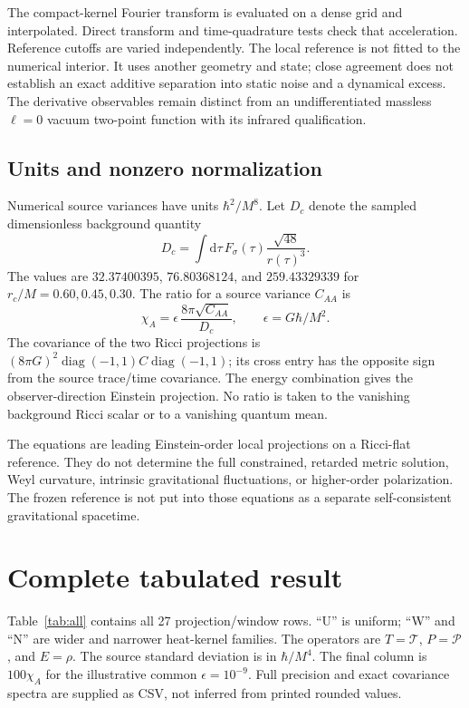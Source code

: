 \documentclass[10pt]{article}
\newcommand{\dd}{\mathrm d}
\newcommand{\Tr}{\mathcal T}
\newcommand{\Pp}{\mathcal P}
\begin{document}
The compact-kernel Fourier transform is evaluated on a dense grid and interpolated. Direct transform and time-quadrature tests check that acceleration. Reference cutoffs are varied independently. The local reference is not fitted to the numerical interior. It uses another geometry and state; close agreement does not establish an exact additive separation into static noise and a dynamical excess. The derivative observables remain distinct from an undifferentiated massless $\ell=0$ vacuum two-point function with its infrared qualification.

\subsection{Units and nonzero normalization}
Numerical source variances have units $\hbar^2/M^8$. Let $D_c$ denote the sampled dimensionless background quantity
\begin{equation}
 D_c=\int \dd\tau\,F_\sigma(\tau)\frac{\sqrt{48}}{r(\tau)^3}.
\end{equation}
The values are $32.37400395$, $76.80368124$, and $259.43329339$ for $r_c/M=0.60,0.45,0.30$. The ratio for a source variance $C_{AA}$ is
\begin{equation}
 \chi_A=\epsilon\,\frac{8\pi\sqrt{C_{AA}}}{D_c},\qquad
 \epsilon=G\hbar/M^2.
\end{equation}
The covariance of the two Ricci projections is $(8\pi G)^2\operatorname{diag}(-1,1)C\operatorname{diag}(-1,1)$; its cross entry has the opposite sign from the source trace/time covariance. The energy combination gives the observer-direction Einstein projection. No ratio is taken to the vanishing background Ricci scalar or to a vanishing quantum mean.

The equations are leading Einstein-order local projections on a Ricci-flat reference. They do not determine the full constrained, retarded metric solution, Weyl curvature, intrinsic gravitational fluctuations, or higher-order polarization. The frozen reference is not put into those equations as a separate self-consistent gravitational spacetime.

\section{Complete tabulated result}
Table~\ref{tab:all} contains all 27 projection/window rows. ``U'' is uniform; ``W'' and ``N'' are wider and narrower heat-kernel families. The operators are $T=\Tr$, $P=\Pp$, and $E=\rho$. The source standard deviation is in $\hbar/M^4$. The final column is $100\chi_A$ for the illustrative common $\epsilon=10^{-9}$. Full precision and exact covariance spectra are supplied as CSV, not inferred from printed rounded values.
\end{document}
